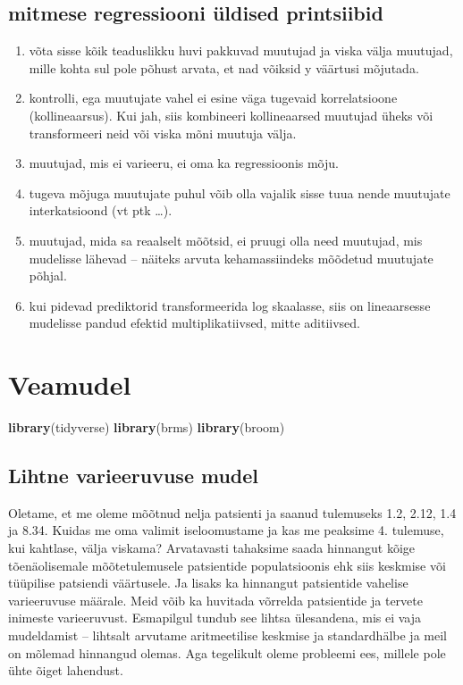 \documentclass[]{book}
\newenvironment{Shaded}{\begin{snugshade}}{\end{snugshade}}
\newcommand{\KeywordTok}[1]{\textcolor[rgb]{0.13,0.29,0.53}{\textbf{#1}}}
\newcommand{\NormalTok}[1]{#1}
\begin{document}
\section{mitmese regressiooni üldised
printsiibid}\label{mitmese-regressiooni-uldised-printsiibid}

\begin{enumerate}
\def\labelenumi{\arabic{enumi}.}
\item
  võta sisse kõik teaduslikku huvi pakkuvad muutujad ja viska välja
  muutujad, mille kohta sul pole põhust arvata, et nad võiksid y
  väärtusi mõjutada.
\item
  kontrolli, ega muutujate vahel ei esine väga tugevaid korrelatsioone
  (kollineaarsus). Kui jah, siis kombineeri kollineaarsed muutujad üheks
  või transformeeri neid või viska mõni muutuja välja.
\item
  muutujad, mis ei varieeru, ei oma ka regressioonis mõju.
\item
  tugeva mõjuga muutujate puhul võib olla vajalik sisse tuua nende
  muutujate interkatsioond (vt ptk \ldots{}).
\item
  muutujad, mida sa reaalselt mõõtsid, ei pruugi olla need muutujad, mis
  mudelisse lähevad -- näiteks arvuta kehamassiindeks mõõdetud muutujate
  põhjal.
\item
  kui pidevad prediktorid transformeerida log skaalasse, siis on
  lineaarsesse mudelisse pandud efektid multiplikatiivsed, mitte
  aditiivsed.
\end{enumerate}

\chapter{Veamudel}\label{veamudel}

\begin{Shaded}
\begin{Highlighting}[]
\KeywordTok{library}\NormalTok{(tidyverse)}
\KeywordTok{library}\NormalTok{(brms)}
\KeywordTok{library}\NormalTok{(broom)}
\end{Highlighting}
\end{Shaded}

\section{Lihtne varieeruvuse mudel}\label{lihtne-varieeruvuse-mudel}

Oletame, et me oleme mõõtnud nelja patsienti ja saanud tulemuseks 1.2,
2.12, 1.4 ja 8.34. Kuidas me oma valimit iseloomustame ja kas me
peaksime 4. tulemuse, kui kahtlase, välja viskama? Arvatavasti tahaksime
saada hinnangut kõige tõenäolisemale mõõtetulemusele patsientide
populatsioonis ehk siis keskmise või tüüpilise patsiendi väärtusele. Ja
lisaks ka hinnangut patsientide vahelise varieeruvuse määrale. Meid võib
ka huvitada võrrelda patsientide ja tervete inimeste varieeruvust.
Esmapilgul tundub see lihtsa ülesandena, mis ei vaja mudeldamist --
lihtsalt arvutame aritmeetilise keskmise ja standardhälbe ja meil on
mõlemad hinnangud olemas. Aga tegelikult oleme probleemi ees, millele
pole ühte õiget lahendust.
\end{document}
